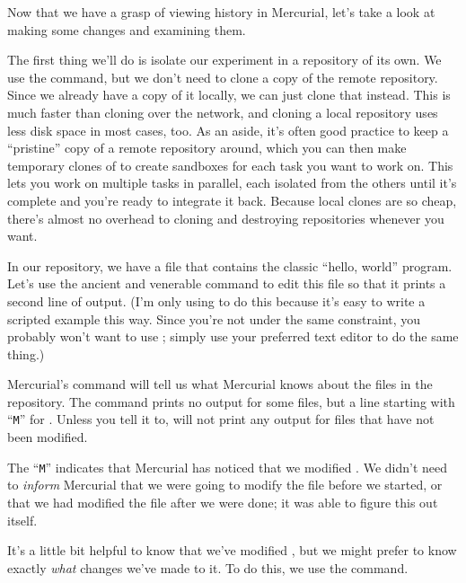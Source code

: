 Now that we have a grasp of viewing history in Mercurial, let's take a
look at making some changes and examining them.

The first thing we'll do is isolate our experiment in a repository of
its own.  We use the  command, but we don't need to
clone a copy of the remote repository.  Since we already have a copy
of it locally, we can just clone that instead.  This is much faster
than cloning over the network, and cloning a local repository uses
less disk space in most cases, too.
As an aside, it's often good practice to keep a ``pristine'' copy of a
remote repository around, which you can then make temporary clones of
to create sandboxes for each task you want to work on.  This lets you
work on multiple tasks in parallel, each isolated from the others
until it's complete and you're ready to integrate it back.  Because
local clones are so cheap, there's almost no overhead to cloning and
destroying repositories whenever you want.

In our  repository, we have a file
 that contains the classic ``hello, world'' program.
Let's use the ancient and venerable  command to edit this
file so that it prints a second line of output.  (I'm only using
 to do this because it's easy to write a scripted example
this way.  Since you're not under the same constraint, you probably
won't want to use ; simply use your preferred text editor to
do the same thing.)

Mercurial's  command will tell us what Mercurial knows
about the files in the repository.
The  command prints no output for some files, but a line
starting with ``\texttt{M}'' for .  Unless you tell
it to,  will not print any output for files that have
not been modified.  

The ``\texttt{M}'' indicates that Mercurial has noticed that we
modified .  We didn't need to \emph{inform}
Mercurial that we were going to modify the file before we started, or
that we had modified the file after we were done; it was able to
figure this out itself.

It's a little bit helpful to know that we've modified
, but we might prefer to know exactly \emph{what}
changes we've made to it.  To do this, we use the 
command.

